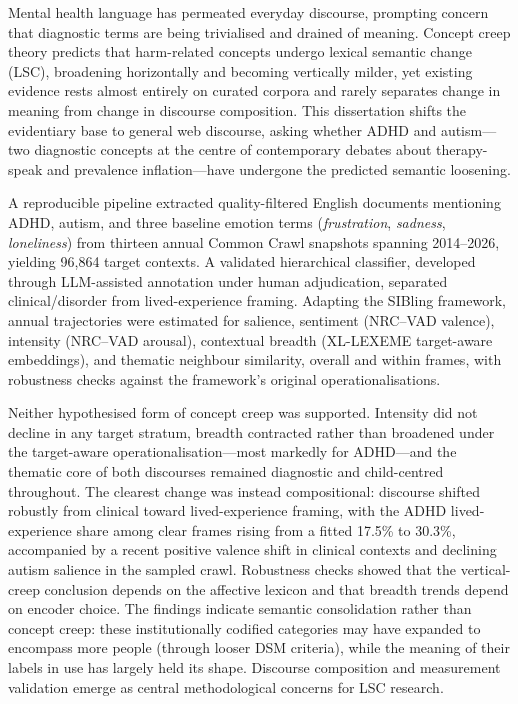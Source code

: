 Mental health language has permeated everyday discourse, prompting concern that diagnostic terms are being trivialised and drained of meaning. Concept creep theory predicts that harm-related concepts undergo lexical semantic change (LSC), broadening horizontally and becoming vertically milder, yet existing evidence rests almost entirely on curated corpora and rarely separates change in meaning from change in discourse composition. This dissertation shifts the evidentiary base to general web discourse, asking whether ADHD and autism—two diagnostic concepts at the centre of contemporary debates about therapy-speak and prevalence inflation—have undergone the predicted semantic loosening.

A reproducible pipeline extracted quality-filtered English documents mentioning ADHD, autism, and three baseline emotion terms (\textit{frustration}, \textit{sadness}, \textit{loneliness}) from thirteen annual Common Crawl snapshots spanning 2014–2026, yielding 96,864 target contexts. A validated hierarchical classifier, developed through LLM-assisted annotation under human adjudication, separated clinical/disorder from lived-experience framing. Adapting the SIBling framework, annual trajectories were estimated for salience, sentiment (NRC–VAD valence), intensity (NRC–VAD arousal), contextual breadth (XL-LEXEME target-aware embeddings), and thematic neighbour similarity, overall and within frames, with robustness checks against the framework's original operationalisations.

Neither hypothesised form of concept creep was supported. Intensity did not decline in any target stratum, breadth contracted rather than broadened under the target-aware operationalisation—most markedly for ADHD—and the thematic core of both discourses remained diagnostic and child-centred throughout. The clearest change was instead compositional: discourse shifted robustly from clinical toward lived-experience framing, with the ADHD lived-experience share among clear frames rising from a fitted 17.5\% to 30.3\%, accompanied by a recent positive valence shift in clinical contexts and declining autism salience in the sampled crawl. Robustness checks showed that the vertical-creep conclusion depends on the affective lexicon and that breadth trends depend on encoder choice. The findings indicate semantic consolidation rather than concept creep: these institutionally codified categories may have expanded to encompass more people (through looser DSM criteria), while the meaning of their labels in use has largely held its shape. Discourse composition and measurement validation emerge as central methodological concerns for LSC research.
